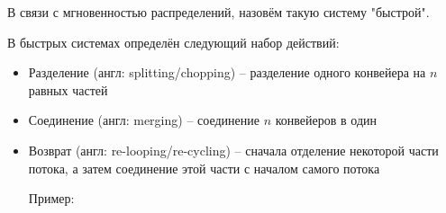 \vspace{0.25in}

\noindent В связи с мгновенностью распределений, назовём такую систему "быстрой".

\vspace{0.4in}

\noindent В быстрых системах определён следующий набор действий:

\begin{itemize}
	\item Разделение (англ: splitting/chopping) -- разделение одного конвейера на $n$ равных частей
	
		
	
	\item Соединение (англ: merging) -- соединение $n$ конвейеров в один
		
	\item Возврат (англ: re-looping/re-cycling) -- сначала отделение некоторой части потока, а затем соединение этой части с началом самого потока
	
		Пример:
		
\end{itemize}
